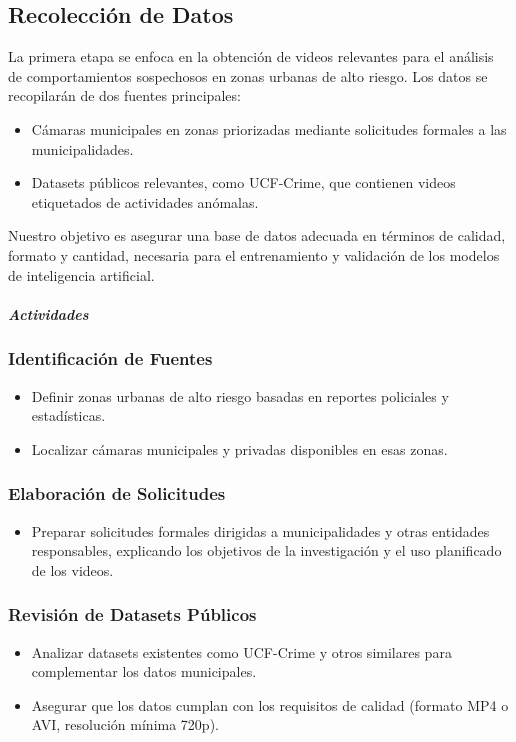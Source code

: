 \subsection{Recolección de Datos}
La primera etapa se enfoca en la obtención de videos relevantes para el análisis de comportamientos sospechosos en zonas urbanas de alto riesgo. Los datos se recopilarán de dos fuentes principales:
\begin{itemize}
    \item Cámaras municipales en zonas priorizadas mediante solicitudes formales a las municipalidades.
    \item Datasets públicos relevantes, como UCF-Crime, que contienen videos etiquetados de actividades anómalas.
\end{itemize}
Nuestro objetivo es asegurar una base de datos adecuada en términos de calidad, formato y cantidad, necesaria para el entrenamiento y validación de los modelos de inteligencia artificial.

\paragraph{\textit{Actividades}}

\subsubsection{Identificación de Fuentes}

\begin{itemize}
    \item Definir zonas urbanas de alto riesgo basadas en reportes policiales y estadísticas.
    \item Localizar cámaras municipales y privadas disponibles en esas zonas.
\end{itemize}

\subsubsection{Elaboración de Solicitudes}
\begin{itemize}
    \item Preparar solicitudes formales dirigidas a municipalidades y otras entidades responsables, explicando los objetivos de la investigación y el uso planificado de los videos.
\end{itemize}

\subsubsection{Revisión de Datasets Públicos}
\begin{itemize}
    \item Analizar datasets existentes como UCF-Crime y otros similares para complementar los datos municipales.
    \item Asegurar que los datos cumplan con los requisitos de calidad (formato MP4 o AVI, resolución mínima 720p).
\end{itemize}

